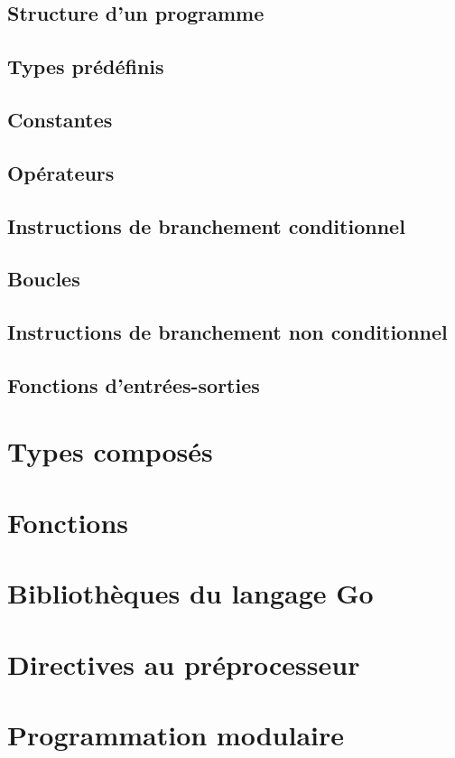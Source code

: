 \documentclass[11pt]{article}
\begin{document}
\subsection{Structure d'un programme}

\subsection{Types prédéfinis}

\subsection{Constantes}

\subsection{Opérateurs}

\subsection{Instructions de branchement conditionnel}

\subsection{Boucles}

\subsection{Instructions de branchement non conditionnel}

\subsection{Fonctions d'entrées-sorties}

\section{Types composés}

\section{Fonctions}

\section{Bibliothèques du langage Go}

\section{Directives au préprocesseur}

\section{Programmation modulaire}
\end{document}
